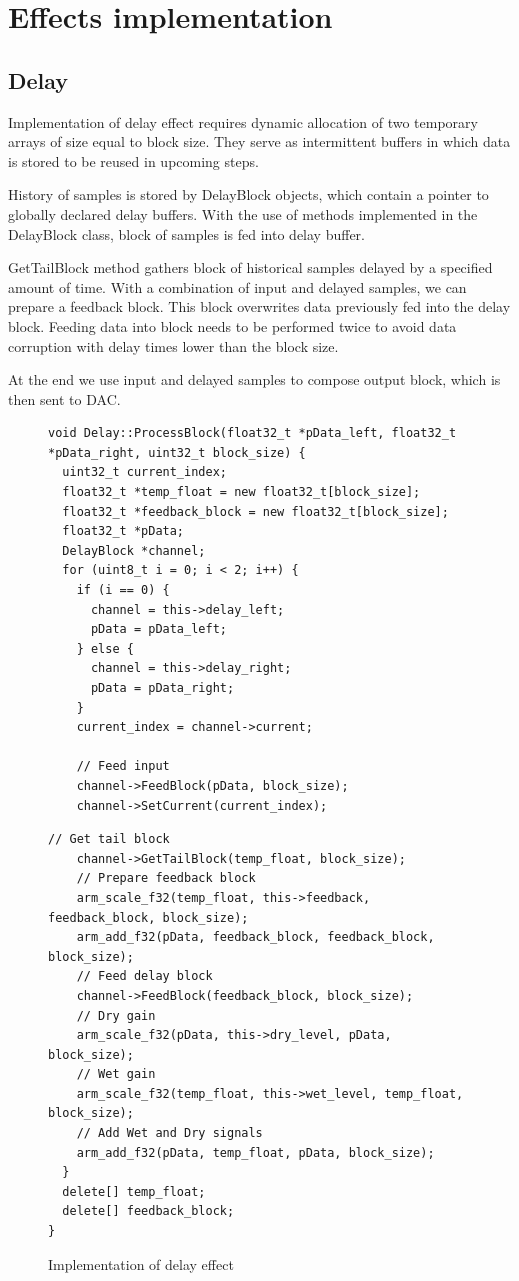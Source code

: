 \documentclass[a4paper,twoside,12pt]{book}
\begin{document}
\section{Effects implementation}

\subsection{Delay}
Implementation of delay effect requires dynamic allocation
of two temporary arrays of size equal to block size.
They serve as intermittent buffers in which data is stored
to be reused in upcoming steps.

History of samples is stored by DelayBlock objects,
which contain a pointer to globally declared delay buffers.
With the use of methods implemented in the DelayBlock class,
block of samples is fed into delay buffer.

GetTailBlock method gathers block of historical samples
delayed by a specified amount of time.
With a combination of input and delayed samples,
we can prepare a feedback block.
This block overwrites data previously fed into the delay block.
Feeding data into block needs to be performed twice
to avoid data corruption with delay times lower than the block size.

At the end we use input and delayed samples
to compose output block, which is then sent to DAC.

\begin{figure}[H]
\centering
\begin{lstlisting}
void Delay::ProcessBlock(float32_t *pData_left, float32_t *pData_right, uint32_t block_size) {
  uint32_t current_index;
  float32_t *temp_float = new float32_t[block_size];
  float32_t *feedback_block = new float32_t[block_size];
  float32_t *pData;
  DelayBlock *channel;
  for (uint8_t i = 0; i < 2; i++) {
    if (i == 0) {
      channel = this->delay_left;
      pData = pData_left;
    } else {
      channel = this->delay_right;
      pData = pData_right;
    }
    current_index = channel->current;

    // Feed input
    channel->FeedBlock(pData, block_size);
    channel->SetCurrent(current_index);
\end{lstlisting}
\end{figure}
\newpage
\begin{figure}[H]
\begin{lstlisting}[firstnumber=20]
    // Get tail block
    channel->GetTailBlock(temp_float, block_size);
    // Prepare feedback block
    arm_scale_f32(temp_float, this->feedback, feedback_block, block_size);
    arm_add_f32(pData, feedback_block, feedback_block, block_size);
    // Feed delay block
    channel->FeedBlock(feedback_block, block_size);
    // Dry gain
    arm_scale_f32(pData, this->dry_level, pData, block_size);
    // Wet gain
    arm_scale_f32(temp_float, this->wet_level, temp_float, block_size);
    // Add Wet and Dry signals
    arm_add_f32(pData, temp_float, pData, block_size);
  }
  delete[] temp_float;
  delete[] feedback_block;
}
\end{lstlisting}
\caption{Implementation of delay effect}
\label{fig:delay}
\end{figure}
\end{document}
